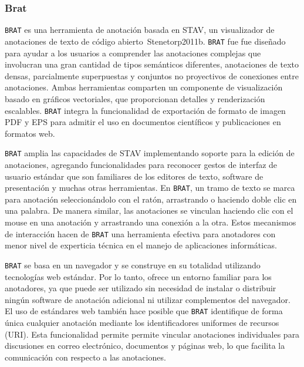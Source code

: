 \subsubsection*{Brat}

\texttt{BRAT} es una herramienta de anotación basada en STAV, un visualizador de anotaciones de texto de código abierto~{Stenetorp2011b}.
\texttt{BRAT} fue fue diseñado para ayudar a los usuarios a comprender las anotaciones complejas que involucran una gran cantidad de tipos semánticos diferentes, anotaciones de texto densas, parcialmente superpuestas y conjuntos no proyectivos de conexiones entre anotaciones.
Ambas herramientas comparten un componente de visualización basado en gráficos vectoriales, que proporcionan detalles y renderización escalables.
\texttt{BRAT} integra la funcionalidad de exportación de formato de imagen PDF y EPS para admitir el uso en documentos científicos y publicaciones en formatos web.

\texttt{BRAT} amplia las capacidades de STAV implementando soporte para la edición de anotaciones, agregando funcionalidades para reconocer gestos de interfaz de usuario estándar que son familiares de los editores de texto, software de presentación y muchas otras herramientas.
En \texttt{BRAT}, un tramo de texto se marca para anotación seleccionándolo con el ratón, arrastrando o haciendo doble clic en una palabra.
De manera similar, las anotaciones se vinculan haciendo clic con el mouse en una anotación y arrastrando una conexión a la otra.
Estos mecanismos de interacción hacen de \texttt{BRAT} una herramienta efectiva para anotadores con menor nivel de experticia técnica en el manejo de aplicaciones informáticas.

\texttt{BRAT} se basa en un navegador y se construye en su totalidad utilizando tecnologías web estándar.
Por lo tanto, ofrece un entorno familiar para los anotadores, ya que puede ser utilizado sin necesidad de instalar o distribuir ningún software de anotación adicional ni utilizar complementos del navegador.
El uso de estándares web también hace posible que \texttt{BRAT} identifique de forma única cualquier anotación mediante los identificadores uniformes de recursos (URI).
Esta funcionalidad permite permite vincular anotaciones individuales para discusiones en correo electrónico, documentos y páginas web, lo que facilita la comunicación con respecto a las anotaciones.

